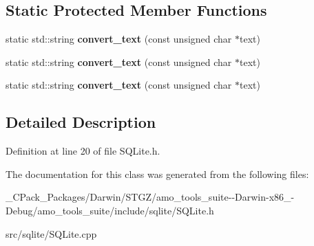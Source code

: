 \subsection*{Static Protected Member Functions}
\begin{DoxyCompactItemize}
\item 
\mbox{\label{class_s_q_lite_wrapper_a46a46fe7c7b6887967540721368acd7c}} 
static std\+::string {\bfseries convert\+\_\+text} (const unsigned char $\ast$text)
\item 
\mbox{\label{class_s_q_lite_wrapper_a824d35be82b4e7771ad056886e4c88d5}} 
static std\+::string {\bfseries convert\+\_\+text} (const unsigned char $\ast$text)
\item 
\mbox{\label{class_s_q_lite_wrapper_a824d35be82b4e7771ad056886e4c88d5}} 
static std\+::string {\bfseries convert\+\_\+text} (const unsigned char $\ast$text)
\end{DoxyCompactItemize}


\subsection{Detailed Description}


Definition at line 20 of file S\+Q\+Lite.\+h.



The documentation for this class was generated from the following files\+:\begin{DoxyCompactItemize}
\item 
\+\_\+\+C\+Pack\+\_\+\+Packages/\+Darwin/\+S\+T\+G\+Z/amo\+\_\+tools\+\_\+suite-\/-\/\+Darwin-\/x86\+\_-\/\+Debug/amo\+\_\+tools\+\_\+suite/include/sqlite/S\+Q\+Lite.\+h\item 
src/sqlite/S\+Q\+Lite.\+cpp\end{DoxyCompactItemize}
